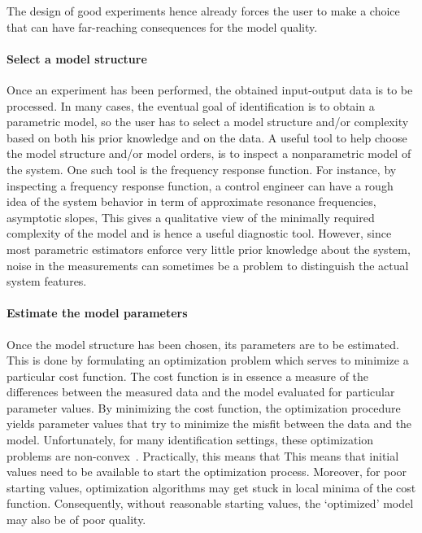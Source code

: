 The design of good experiments hence already forces the user to make a choice that can have far-reaching consequences for the model quality.

\paragraph{Select a model structure}
Once an experiment has been performed, the obtained input-output data is to be processed.
In many cases, the eventual goal of identification is to obtain a parametric model, so the user has to select a model structure and/or complexity based on both his prior knowledge and on the data.
A useful tool to help choose the model structure and/or model orders, is to inspect a nonparametric model of the system.
One such tool is the frequency response function.
For instance, by inspecting a frequency response function, a control engineer can have a rough idea of the system behavior in term of  approximate resonance frequencies, asymptotic slopes, 
This gives a qualitative view of the minimally required complexity of the model and is hence a useful diagnostic tool.
However, since most parametric estimators enforce very little prior knowledge about the system, noise in the measurements can sometimes be a problem to distinguish the actual system features.

\paragraph{Estimate the model parameters}
Once the model structure has been chosen, its parameters are to be estimated.
This is done by formulating an optimization problem which serves to minimize a particular cost function.
The cost function is in essence a measure of the differences between the measured data and the model evaluated for particular parameter values.
By minimizing the cost function, the optimization procedure yields parameter values that try to minimize the misfit between the data and the model.
Unfortunately, for many identification settings, these optimization problems are non-convex~\citep{Boyd2004}.
Practically, this means that 
This means that initial values need to be available to start the optimization process.
Moreover, for poor starting values, optimization algorithms may get stuck in local minima of the cost function.
Consequently, without reasonable starting values, the `optimized' model may also be of poor quality. 


